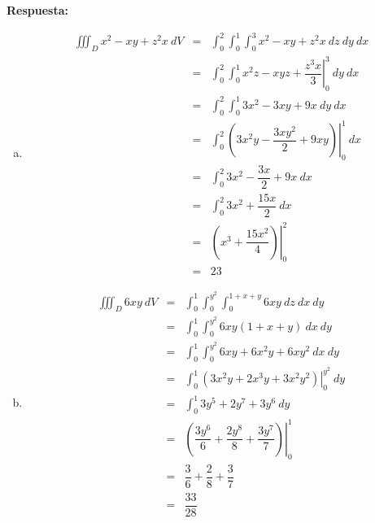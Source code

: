 \documentclass{article}
\begin{document}
\begin{enumerate}[{\bf P1)}, leftmargin=*, labelsep=3mm]
  \vspace{5mm}
  \noindent\textbf{Respuesta:}
    \begin{enumerate}[a)]
      \item 
        \begin{eqnarray*}
          \iiint_D x^2 - xy + z^2 x\ dV 
            &=& \int_0^2 \int_0^1 \int_0^3 x^2 - xy + z^2 x\ dz\ dy\ dx\\
            &=& \int_0^2 \int_0^1 \left.x^2 z - xyz + \dfrac{z^3 x}{3}\right|_0^3\ dy\ dx\\
            &=& \int_0^2 \int_0^1 3x^2 - 3xy + 9x\ dy\ dx\\
            &=& \int_0^2\left.\left(3x^2y-\dfrac{3x y^2}{2}+9xy\right)\right|_0^1\ dx\\
            &=& \int_0^2 3x^2 - \dfrac{3x}{2} + 9x\ dx\\
            &=& \int_0^2 3x^2 + \dfrac{15x}{2}\ dx\\
            &=& \left.\left(x^3 + \dfrac{15x^2}{4}\right)\right|_0^2\\
            &=& 23
        \end{eqnarray*}
      \item 
        \begin{eqnarray*}
          \iiint_D 6xy\ dV 
            &=& \int_0^1 \int_0^{y^2} \int_0^{1+x+y} 6xy\ dz\ dx\ dy\\
            &=& \int_0^1 \int_0^{y^2} 6xy (1 + x + y)\ dx\ dy\\
            &=& \int_0^1 \int_0^{y^2} 6xy + 6x^2 y + 6xy^2\ dx\ dy\\
            &=& \int_0^1 \left. \left(3x^2 y + 2x^3 y + 3x^2 y^2\right) \right|_0^{y^2}\ dy\\
            &=& \int_0^1 3y^5 + 2y^7 + 3y^6\ dy\\
            &=& \left.\left(\dfrac{3y^6}{6} + \dfrac{2y^8}{8} + \dfrac{3y^7}{7}\right)\right|_0^1\\
            &=& \dfrac{3}{6} + \dfrac{2}{8} + \dfrac{3}{7}\\
            &=& \dfrac{33}{28}
        \end{eqnarray*}
    \end{enumerate}


\end{enumerate}
\end{document}
